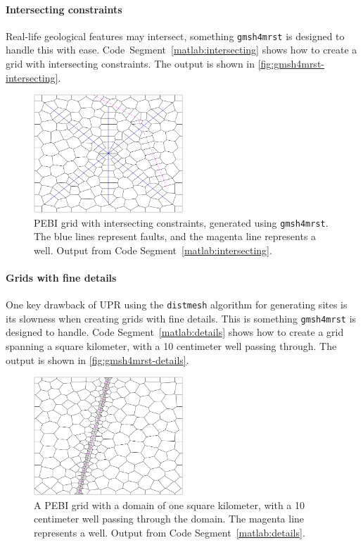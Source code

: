 \paragraph{Intersecting constraints}
Real-life geological features may intersect, something \verb|gmsh4mrst| is designed to handle this with ease. Code~Segment~\ref{matlab:intersecting} shows how to create a grid with intersecting constraints. The output is shown in \autoref{fig:gmsh4mrst-intersecting}.

\begin{figure}[htp]
    \centering
    \includegraphics[width=0.5\textwidth]{report/Images/Combining software/gmsh4mrst examples/intersecting_constraints.png}
    \caption[PEBI grid with intersecting constraints, generated using \texttt{gmsh4mrst}]{PEBI grid with intersecting constraints, generated using \texttt{gmsh4mrst}. The blue lines represent faults, and the magenta line represents a well. Output from Code Segment~\ref{matlab:intersecting}.}
    \label{fig:gmsh4mrst-intersecting}
\end{figure}

\paragraph{Grids with fine details}
One key drawback of UPR using the \verb|distmesh| algorithm for generating sites is its slowness when creating grids with fine details. This is something \verb|gmsh4mrst| is designed to handle. Code Segment~\ref{matlab:details} shows how to create a grid spanning a square kilometer, with a 10 centimeter well passing through. The output is shown in \autoref{fig:gmsh4mrst-details}.

\begin{figure}[htp]
    \centering
    \includegraphics[width=0.5\textwidth]{report/Images/Combining software/gmsh4mrst examples/fine_details.png}
    \caption[PEBI grid with fine details, generated using \texttt{gmsh4mrst}]{A PEBI grid with a domain of one square kilometer, with a 10 centimeter well passing through the domain. The magenta line represents a well. Output from Code Segment~\ref{matlab:details}.}
    \label{fig:gmsh4mrst-details}
\end{figure}